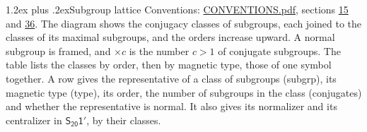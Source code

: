 \documentclass[10pt,a4paper]{article}
\makeatletter
\renewcommand\section{\@startsection{section}{1}{\z@}{-3ex plus -1ex minus -.2ex}%
  {1.2ex plus .2ex}{\normalfont\large\sffamily\bfseries\color{parttitle}}}
\numberwithin{equation}{section}
\newcommand{\grp}[1]{\mathsf{#1}}
\makeatother
\begin{document}
\section{Subgroup lattice}\label{s:subgroups}
Conventions: \href{../../CONVENTIONS.pdf}{CONVENTIONS.pdf}, sections \href{../../../rotation/CONVENTIONS.pdf\#conv.15}{15} and \href{../../CONVENTIONS.pdf\#conv.36}{36}.
The diagram shows the conjugacy classes of subgroups, each joined to the classes of its maximal subgroups, and the orders increase upward. \label{n:index.conjugates.c}A normal subgroup is framed, and ${\times}c$ is the number $c > 1$ of conjugate subgroups. The table lists the classes by order, then by magnetic type, those of one symbol together. \label{n:head.subgroup}\label{n:head.magnetic.type}\label{n:head.order}\label{n:head.conjugates}\label{n:head.normal}A row gives the representative of a class of subgroups (subgrp), its magnetic type (type), its order, the number of subgroups in the class (conjugates) and whether the representative is normal. \label{n:head.normalizer}\label{n:head.centralizer}It also gives its normalizer and its centralizer in $\grp{S_{20}1'}$, by their classes. 
\end{document}
